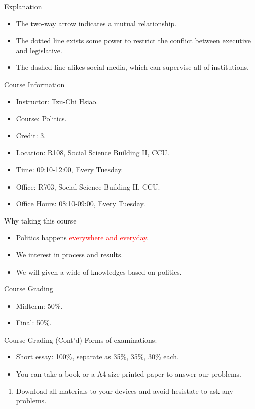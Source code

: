 \documentclass{beamer}
\begin{document}
\begin{frame}{Explanation}
\begin{itemize}
\item The two-way arrow indicates a mutual relationship.
\item The dotted line exists some power to restrict the conflict between executive and legislative.
\item The dashed line alikes social media, which can supervise all of institutions.
\end{itemize}
\end{frame}
\begin{frame}{Course Information}
\begin{itemize}
\item Instructor: Tzu-Chi Hsiao.
\item Course: Politics.
\item Credit: 3.
\item Location: R108, Social Science Building II, CCU.
\item Time: 09:10-12:00, Every Tuesday.
\item Office: R703, Social Science Building II, CCU.
\item Office Hours: 08:10-09:00, Every Tuesday.
\end{itemize}
\end{frame}
\begin{frame}{Why taking this course}
\begin{itemize}
\item Politics happens \textcolor{red}{everywhere and everyday}.
\item We interest in process and results.
\item We will given a wide of knowledges based on politics.
\end{itemize}
\end{frame}
\begin{frame}{Course Grading}
\begin{itemize}
\item Midterm: 50\%.
\item Final: 50\%.
\end{itemize}
\end{frame}
\begin{frame}{Course Grading (Cont'd)}
Forms of examinations:
\begin{itemize}
\item Short essay: 100\%, separate as 35\%, 35\%, 30\% each.
\item You can take a book or a A4-size printed paper to answer our problems.
\end{itemize}
\begin{enumerate}
\item Download all materials to your devices and avoid hesistate to ask any problems.
\end{enumerate}
\end{frame}
\end{document}
